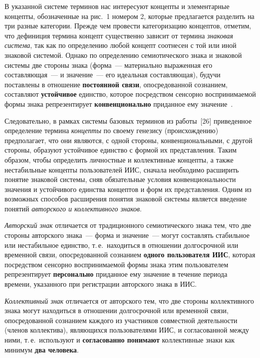 \begin{multicols}{2}
   В указанной системе терминов нас интересуют концепты и элементарные концепты,
обозначенные на рис.~1 номером 2, которые предлагается разделить на три разные
категории. Прежде чем провести категоризацию концептов, отметим, что дефиниция термина
концепт существенно зависит от термина \textit{знаковая система}, так как по определению
любой концепт соотнесен с той или иной знаковой системой. Однако по определению
се\-мио\-ти\-че\-ско\-го знака и знаковой системы две стороны знака (форма~--- материально
выраженная его составляющая~---  и значение~--- его идеальная со\-став\-ля\-ющая), будучи
поставлены в отношение \textbf{постоянной связи}, опосредованной сознанием, составляют
\textbf{устойчивое} единство, которое посредством сенсорно воспринимаемой формы знака
репрезентирует \textbf{конвенционально} приданное ему значение~\cite{35za}.

   Следовательно, в рамках системы базовых терминов из работы~[26] приведенное
определение термина \textit{концепты} по своему генезису (про\-ис\-хож\-де\-нию) предполагает,
что они являются, с одной стороны, конвенциональными, с другой стороны, образуют
устойчивое единство с формой их представления. Таким образом, чтобы определить
личностные и коллективные концепты, а также %
 неста\-биль\-ные концепты пользователей ИИС,
сначала необходимо расширить понятие знаковой сис\-те\-мы, сняв обязательные условия
кон\-вен\-цио\-наль\-ности значения и устойчивого единства кон\-цеп\-тов и форм их представления.
Одним из возможных способов расширения понятия знаковой системы является введение
понятий \textit{авторского и коллективного знаков}.

   \textit{Авторский знак} отличается от традиционного семиотического знака тем, что две
стороны авторского знака~--- форма и значение~--- могут со\-став\-лять стабильное или
нестабильное единство, т.\,е.\ находиться в отношении долгосрочной или временной связи,
опосредованной сознанием \textbf{одного пользователя ИИС}, которая посредством
сенсорно воспринимаемой формы знака этим пользователем репрезентирует
\textbf{персонально} приданное ему значение в течение периода времени, указанного при
регистрации авторского знака в ИИС.

   \textit{Коллективный знак} отличается от авторского тем, что две стороны коллективного
знака могут находиться в отношении долгосрочной или временной связи, опосредованной
сознанием каждого из участников совместной деятельности (членов коллектива),
являющихся пользователями ИИС, и согласованной между ними, т.\,е.\ используют и
\textbf{согласованно понимают} коллективные знаки как минимум \textbf{два человека}.


\end{multicols}
